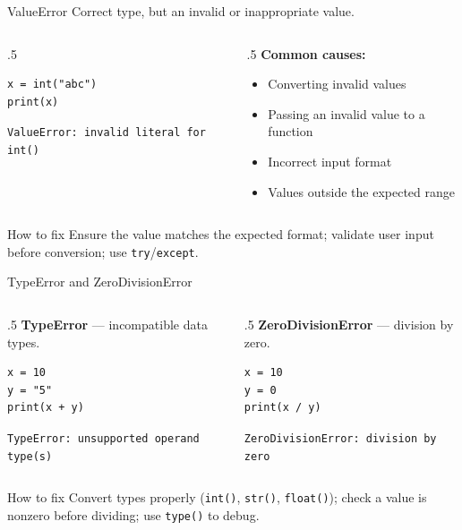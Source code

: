 \documentclass[9pt,aspectratio=169,xcolor=table]{beamer}
\begin{document}
\begin{frame}[fragile]{ValueError}
    \leavevmode
    Correct \alert{type}, but an invalid or inappropriate \alert{value}.

    \begin{columns}[t]
        \begin{column}{.5\textwidth}
\begin{lstlisting}
x = int("abc")
print(x)
\end{lstlisting}
            \texttt{\scriptsize ValueError: invalid literal for int()}
        \end{column}
        \begin{column}{.5\textwidth}
            \small
            \textbf{Common causes:}
            \begin{itemize}\scriptsize
                \item Converting invalid values
                \item Passing an invalid value to a function
                \item Incorrect input format
                \item Values outside the expected range
            \end{itemize}
        \end{column}
    \end{columns}

    \vspace{2mm}
    \begin{block}{How to fix}
        \small Ensure the value matches the expected format; validate
        user input before conversion; use \texttt{try}/\texttt{except}.
    \end{block}
\end{frame}

\begin{frame}[fragile]{TypeError and ZeroDivisionError}
    \leavevmode
    \begin{columns}[t]
        \begin{column}{.5\textwidth}
            \textbf{TypeError} --- incompatible data types.
\begin{lstlisting}
x = 10
y = "5"
print(x + y)
\end{lstlisting}
            \texttt{\scriptsize TypeError: unsupported operand type(s)}
        \end{column}
        \begin{column}{.5\textwidth}
            \textbf{ZeroDivisionError} --- division by zero.
\begin{lstlisting}
x = 10
y = 0
print(x / y)
\end{lstlisting}
            \texttt{\scriptsize ZeroDivisionError: division by zero}
        \end{column}
    \end{columns}

    \vspace{2mm}
    \begin{block}{How to fix}
        \small Convert types properly (\texttt{int()}, \texttt{str()},
        \texttt{float()}); check a value is nonzero before dividing;
        use \texttt{type()} to debug.
    \end{block}
\end{frame}
\end{document}
